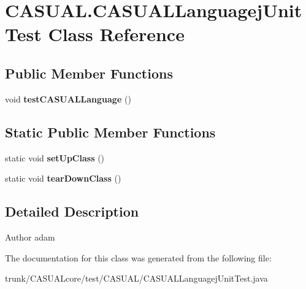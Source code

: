 \hypertarget{classCASUAL_1_1CASUALLanguagejUnitTest}{\section{C\-A\-S\-U\-A\-L.\-C\-A\-S\-U\-A\-L\-Languagej\-Unit\-Test Class Reference}
\label{classCASUAL_1_1CASUALLanguagejUnitTest}
}
\subsection*{Public Member Functions}
\begin{DoxyCompactItemize}
\item 
\hypertarget{classCASUAL_1_1CASUALLanguagejUnitTest_ac33eddf034afaaf970e098b0d781373e}{void {\bfseries test\-C\-A\-S\-U\-A\-L\-Language} ()}\label{classCASUAL_1_1CASUALLanguagejUnitTest_ac33eddf034afaaf970e098b0d781373e}

\end{DoxyCompactItemize}
\subsection*{Static Public Member Functions}
\begin{DoxyCompactItemize}
\item 
\hypertarget{classCASUAL_1_1CASUALLanguagejUnitTest_a492ae1dc59999557c58c72065d7981fa}{static void {\bfseries set\-Up\-Class} ()}\label{classCASUAL_1_1CASUALLanguagejUnitTest_a492ae1dc59999557c58c72065d7981fa}

\item 
\hypertarget{classCASUAL_1_1CASUALLanguagejUnitTest_a30a633e5ef6562da3a428183f89f52f0}{static void {\bfseries tear\-Down\-Class} ()}\label{classCASUAL_1_1CASUALLanguagejUnitTest_a30a633e5ef6562da3a428183f89f52f0}

\end{DoxyCompactItemize}


\subsection{Detailed Description}
\begin{DoxyAuthor}{Author}
adam 
\end{DoxyAuthor}


The documentation for this class was generated from the following file\-:\begin{DoxyCompactItemize}
\item 
trunk/\-C\-A\-S\-U\-A\-Lcore/test/\-C\-A\-S\-U\-A\-L/C\-A\-S\-U\-A\-L\-Languagej\-Unit\-Test.\-java\end{DoxyCompactItemize}
